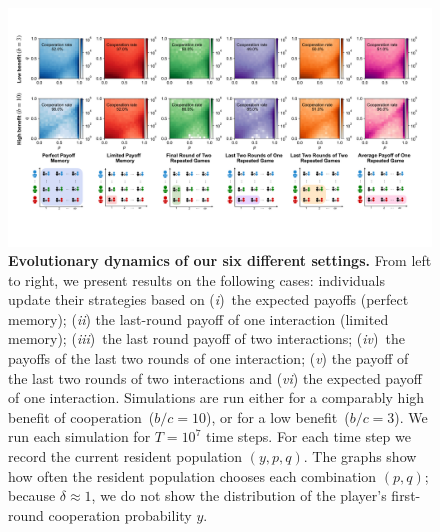 \documentclass[11pt]{article}
\theoremstyle{plainCl1}
\theoremstyle{plainCl2}
\begin{document}
\begin{figure}[t!]
    \centering 
    \includegraphics[width=\textwidth]{static/more_memory_heatmaps_donation_game_with_illustrations.pdf}
    \caption{\textbf{Evolutionary dynamics of our six different settings.}
    From left to right, we present results on the following cases: individuals update their strategies based on
    ({\it i})~the expected payoffs (perfect memory); ({\it ii}) the last-round payoff
    of one interaction (limited memory); ({\it iii})~the last round payoff of two
    interactions; ({\it iv})~the payoffs of the last two rounds of one interaction; 
    ({\it v}) the payoff of the last two rounds of two interactions and
    ({\it vi}) the expected payoff of one interaction.
    Simulations are run either for a comparably high benefit of cooperation~($b/c\!=\!10$), or for a low benefit~($b/c\!=\!3$).
    We run each simulation for \(T= 10^7\) time steps. For each time step we record the current resident
    population \((y, p, q)\). The graphs show how often the
    resident population chooses each combination \((p, q)\); because $\delta\!\approx\!1$, we do not show the distribution of the player's first-round cooperation probability $y$.}\label{fig:expected_payoffs_results}
    \end{figure}
\end{document}
